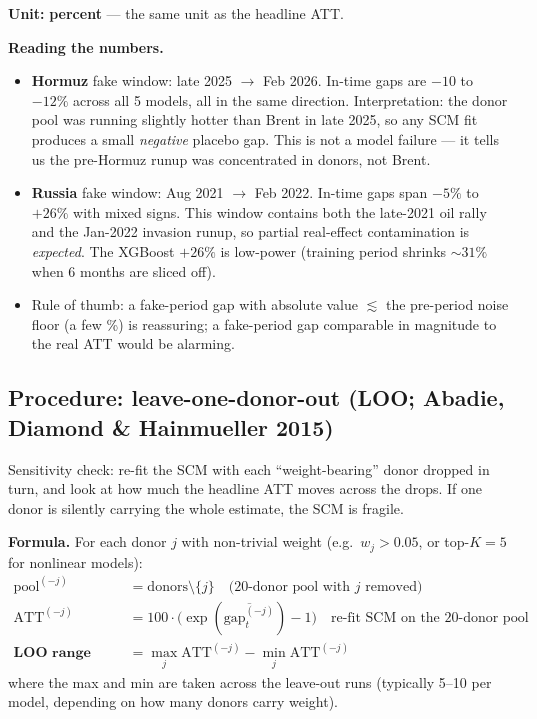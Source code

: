 \documentclass[11pt,a4paper]{article}
\newcommand{\highlight}[1]{\textcolor{accent}{\textbf{#1}}}
\begin{document}
\textbf{Unit:} \highlight{percent} --- the same unit as the headline ATT.

\textbf{Reading the numbers.}
\begin{itemize}
  \item \textbf{Hormuz} fake window: late 2025 $\to$ Feb 2026. In-time gaps are $-10$ to $-12\%$ across all 5 models, all in the same direction. Interpretation: the donor pool was running slightly hotter than Brent in late 2025, so any SCM fit produces a small \emph{negative} placebo gap. This is not a model failure --- it tells us the pre-Hormuz runup was concentrated in donors, not Brent.
  \item \textbf{Russia} fake window: Aug 2021 $\to$ Feb 2022. In-time gaps span $-5\%$ to $+26\%$ with mixed signs. This window contains both the late-2021 oil rally and the Jan-2022 invasion runup, so partial real-effect contamination is \emph{expected}. The XGBoost $+26\%$ is low-power (training period shrinks $\sim 31\%$ when 6 months are sliced off).
  \item Rule of thumb: a fake-period gap with absolute value $\lesssim$ the pre-period noise floor (a few \%) is reassuring; a fake-period gap comparable in magnitude to the real ATT would be alarming.
\end{itemize}

\subsection{Procedure: leave-one-donor-out (LOO; Abadie, Diamond \& Hainmueller 2015)}

Sensitivity check: re-fit the SCM with each ``weight-bearing'' donor dropped in turn, and look at how much the headline ATT moves across the drops. If one donor is silently carrying the whole estimate, the SCM is fragile.

\textbf{Formula.} For each donor $j$ with non-trivial weight (e.g.\ $w_j > 0.05$, or top-$K=5$ for nonlinear models):
\begin{align*}
\text{pool}^{(-j)} &= \text{donors} \setminus \{j\} \quad \text{(20-donor pool with } j \text{ removed)}\\
\text{ATT}^{(-j)} &= 100 \cdot \big(\exp(\overline{\text{gap}^{(-j)}_t}) - 1\big) \quad \text{re-fit SCM on the 20-donor pool}\\
\textbf{LOO range (pp)} &= \max_j \text{ATT}^{(-j)} - \min_j \text{ATT}^{(-j)}
\end{align*}
where the max and min are taken across the leave-out runs (typically 5--10 per model, depending on how many donors carry weight).
\end{document}
